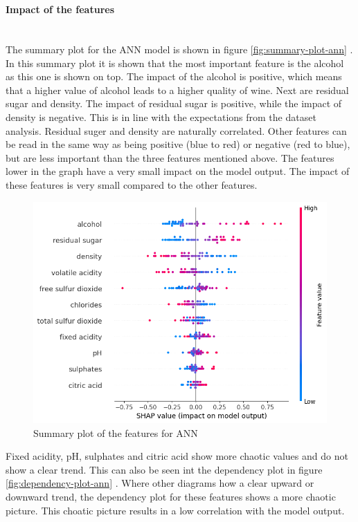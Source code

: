 \documentclass{article}
\newcommand{\subsubsubsection}[1]{%
  \paragraph{#1}\mbox{}\\}
\begin{document}
\subsubsubsection{Impact of the features}
The summary plot for the ANN model is shown in figure \autoref{fig:summary-plot-ann} .
In this summary plot it is shown that the most important feature is the alcohol as this one is shown on top.
The impact of the alcohol is positive, which means that a higher value of alcohol leads to a higher quality of wine.
Next are residual sugar and density. The impact of residual sugar is positive, while the impact of density is negative.
This is in line with the expectations from the dataset analysis. Residual suger and density are naturally correlated.
Other features can be read in the same way as being positive (blue to red) or negative (red to blue), but are less important than the three features mentioned above.
The features lower in the graph have a very small impact on the model output.
The impact of these features is very small compared to the other features.

\begin{figure}
	\centering
	\includegraphics[width=\linewidth]{figures/shap-summary-ann.png}
	\caption{Summary plot of the features for ANN}
	\label{fig:summary-plot-ann}
\end{figure}

Fixed acidity, pH, sulphates and citric acid show more chaotic values and do not show a clear trend.
This can also be seen int the dependency plot in figure \autoref{fig:dependency-plot-ann} .
Where other diagrams how a clear upward or downward trend, the dependency plot for these features shows a more chaotic picture.
This choatic picture results in a low correlation with the model output.
\end{document}
